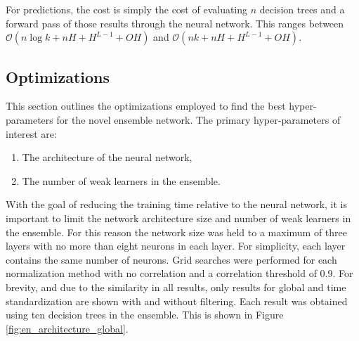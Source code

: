 \documentclass[paper=a4, fontsize=11pt]{scrartcl} %
\begin{document}
For predictions, the cost is simply the cost of evaluating $n$ decision trees and a forward pass of those results through the neural network.
This ranges between \\ $\mathcal{O} \left( n \log k + n H + H^{L-1} + O H \right)$ and $\mathcal{O} \left( n k + n H + H^{L-1} + O H \right)$.

\subsection*{Optimizations}

This section outlines the optimizations employed to find the best hyper-parameters for the novel ensemble network.
The primary hyper-parameters of interest are:
\begin{enumerate}
	\item The architecture of the neural network,
	\item The number of weak learners in the ensemble.
\end{enumerate}
With the goal of reducing the training time relative to the neural network, it is important to limit the network architecture size and number of weak learners in the ensemble.
For this reason the network size was held to a maximum of three layers with no more than eight neurons in each layer.
For simplicity, each layer contains the same number of neurons.
Grid searches were performed for each normalization method with no correlation and a correlation threshold of 0.9.
For brevity, and due to the similarity in all results, only results for global and time standardization are shown with and without filtering.
Each result was obtained using ten decision trees in the ensemble.
This is shown in Figure \ref{fig:en_architecture_global}.
\end{document}
